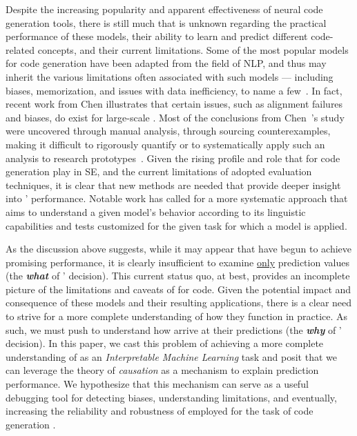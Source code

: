 Despite the increasing popularity and apparent effectiveness of neural code generation tools, there is still much that is unknown regarding the practical performance of these models, their ability to learn and predict different code-related concepts, and their current limitations. Some of the most popular models for code generation have been adapted from the field of NLP, and thus may inherit the various limitations often associated with such models --- including biases, memorization, and issues with data inefficiency, to name a few~\citep{bender2021parrots}. In fact, recent work from Chen \etal \citep{chen2021evaluating} illustrates that certain issues, such as alignment failures and biases, do exist for large-scale \nlms. Most of the conclusions from Chen~\etal's study were uncovered through manual analysis, \eg through sourcing counterexamples, making it difficult to rigorously quantify or to systematically apply such an analysis to research prototypes~\citep{wu2019errudite}. Given the rising profile and role that \nlms for code generation play in SE, and the current limitations of adopted evaluation techniques, it is clear that new methods are needed that provide deeper insight into \nlms' performance. Notable work has called for a more systematic approach \citep{ribeiro2020checklist} that aims to understand a given model's behavior according to its linguistic capabilities and tests customized for the given task for which a model is applied.

As the discussion above suggests, while it may appear that \nlms have begun to achieve promising performance, it is clearly insufficient to examine \underline{only} prediction values (\ie the \textit{\textbf{what}} of \nlms' decision). This current status quo, at best, provides an incomplete picture of the limitations and caveats of \nlms for code. %
Given the potential impact and consequence of these models and their resulting applications, there is a clear need to strive for a more complete understanding of how they function in practice. As such, we must push to understand how \nlms arrive at their predictions (\ie the \textit{\textbf{why}} of \nlms' decision). In this paper, we cast this problem of achieving a more complete understanding of \nlms as an \textit{Interpretable Machine Learning} task and posit that we can leverage the theory of \textit{causation} as a mechanism to explain \nlms prediction performance. We hypothesize that this mechanism can serve as a useful debugging tool for detecting biases, understanding limitations, and eventually, increasing the reliability and robustness of \nlms employed for the task of code generation \citep{molnar2019interpret,Doshi-Velez2017TowardsLearning}.


